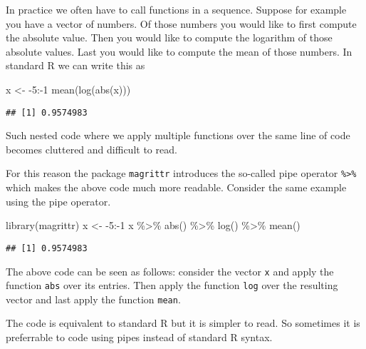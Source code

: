 \documentclass[
]{book}
\newenvironment{Shaded}{\begin{snugshade}}{\end{snugshade}}
\newcommand{\DecValTok}[1]{\textcolor[rgb]{0.00,0.00,0.81}{#1}}
\newcommand{\FunctionTok}[1]{\textcolor[rgb]{0.00,0.00,0.00}{#1}}
\newcommand{\NormalTok}[1]{#1}
\newcommand{\OtherTok}[1]{\textcolor[rgb]{0.56,0.35,0.01}{#1}}
\newcommand{\SpecialCharTok}[1]{\textcolor[rgb]{0.00,0.00,0.00}{#1}}
\begin{document}
In practice we often have to call functions in a sequence. Suppose for example you have a vector of numbers. Of those numbers you would like to first compute the absolute value. Then you would like to compute the logarithm of those absolute values. Last you would like to compute the mean of those numbers. In standard R we can write this as

\begin{Shaded}
\begin{Highlighting}[]
\NormalTok{x }\OtherTok{\textless{}{-}} \SpecialCharTok{{-}}\DecValTok{5}\SpecialCharTok{:{-}}\DecValTok{1}
\FunctionTok{mean}\NormalTok{(}\FunctionTok{log}\NormalTok{(}\FunctionTok{abs}\NormalTok{(x)))}
\end{Highlighting}
\end{Shaded}

\begin{verbatim}
## [1] 0.9574983
\end{verbatim}

Such nested code where we apply multiple functions over the same line of code becomes cluttered and difficult to read.

For this reason the package \texttt{magrittr} introduces the so-called pipe operator \texttt{\%\textgreater{}\%} which makes the above code much more readable. Consider the same example using the pipe operator.

\begin{Shaded}
\begin{Highlighting}[]
\FunctionTok{library}\NormalTok{(magrittr)}
\NormalTok{x }\OtherTok{\textless{}{-}} \SpecialCharTok{{-}}\DecValTok{5}\SpecialCharTok{:{-}}\DecValTok{1}
\NormalTok{x }\SpecialCharTok{\%\textgreater{}\%} \FunctionTok{abs}\NormalTok{() }\SpecialCharTok{\%\textgreater{}\%} \FunctionTok{log}\NormalTok{() }\SpecialCharTok{\%\textgreater{}\%} \FunctionTok{mean}\NormalTok{()}
\end{Highlighting}
\end{Shaded}

\begin{verbatim}
## [1] 0.9574983
\end{verbatim}

The above code can be seen as follows: consider the vector \texttt{x} and apply the function \texttt{abs} over its entries. Then apply the function \texttt{log} over the resulting vector and last apply the function \texttt{mean}.

The code is equivalent to standard R but it is simpler to read. So sometimes it is preferrable to code using pipes instead of standard R syntax.
\end{document}
